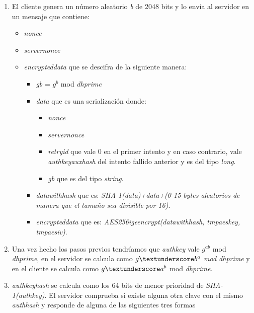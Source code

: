 \begin{enumerate}
	\item El cliente genera un número aleatorio \emph{b} de 2048 bits y lo envía al servidor en un mensaje que contiene:
		\begin{itemize}
			\item \emph{nonce}
			\item \emph{server\textunderscore nonce}
			\item \emph{encrypted\textunderscore data} que se descifra de la siguiente manera:
				\begin{itemize}
					\item \emph{g\textunderscore b} = $g^b$ mod \emph{dh\textunderscore prime}
					\item \emph{data} que es una serialización donde:
						\begin{itemize}
							\item \emph{nonce}
							\item \emph{server\textunderscore nonce}
							\item \emph{retry\textunderscore id} que vale 0 en el primer intento y en caso contrario, vale \emph{auth\textunderscore key\textunderscore aux\textunderscore hash} del intento fallido anterior y es del tipo \emph{long}.
							\item \emph{g\textunderscore b} que es del tipo \emph{string}.
						\end{itemize}
					\item \emph{data\textunderscore with\textunderscore hash} que es: \emph{SHA-1(data)+data+(0-15 bytes aleatorios de manera que el tamaño sea divisible por 16)}.
					\item \emph{encrypted\textunderscore data} que es: \emph{AES256\textunderscore ige\textunderscore encrypt(data\textunderscore with\textunderscore hash, tmp\textunderscore aes\textunderscore key, tmp\textunderscore aes\textunderscore iv)}.
				\end{itemize}
		\end{itemize}
	\item Una vez hecho los pasos previos tendríamos que \emph{auth\textunderscore key} vale $g^{ab}$ mod \emph{dh\textunderscore prime}, en el servidor se calcula como \emph{$g\textunderscore b^{a}$ mod \emph{dh\textunderscore prime}} y en el cliente se calcula como $g\textunderscore a^b$ mod \emph{dh\textunderscore prime}.
	\item \emph{auth\textunderscore key\textunderscore hash} se calcula como los 64 bits de menor prioridad de \emph{SHA-1(auth\textunderscore key)}. El servidor comprueba si existe alguna otra clave con el mismo \emph{auth\textunderscore hash} y responde de alguna de las siguientes tres formas

\end{enumerate}
